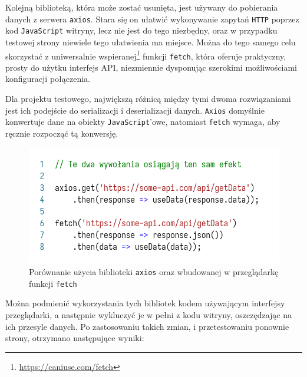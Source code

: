 \documentclass[licencjacka]{pracadypl}
\begin{document}
Kolejną biblioteką, która może zostać usunięta, jest używany do pobierania danych z serwera \texttt{axios}. Stara się on ułatwić wykonywanie zapytań \texttt{HTTP} poprzez kod \texttt{JavaScript} witryny, lecz nie jest do tego niezbędny, oraz w przypadku testowej strony niewiele tego ułatwienia ma miejsce. Można do tego samego celu skorzystać z uniwersalnie wspieranej\footnote{\url{https://caniuse.com/fetch}} funkcji \texttt{fetch}, która oferuje praktyczny, prosty do użytku interfejs API, niezmiennie dysponując szerokimi możliwościami konfiguracji połączenia.

Dla projektu testowego, największą różnicą między tymi dwoma rozwiązaniami jest ich podejście do serializacji i deserializacji danych. \texttt{Axios} domyślnie konwertuje dane na obiekty \texttt{JavaScript}'owe, natomiast \texttt{fetch} wymaga, aby ręcznie rozpocząć tą konwersję.

\begin{figure}[H]
  \centering
  \includegraphics[width=\linewidth]{images/code-js-axios-v-fetch.png}
  \caption{Porównanie użycia biblioteki \texttt{axios} oraz wbudowanej w przeglądarkę funkcji \texttt{fetch}}
  \label{fig:code-js-axios-v-fetch}
\end{figure}

Można podmienić wykorzystania tych bibliotek kodem używającym interfejsy przeglądarki, a następnie wykluczyć je w pełni z kodu witryny, oszczędzając na ich przesyle danych. Po zastosowaniu takich zmian, i przetestowaniu ponownie strony, otrzymano następujące wyniki:
\end{document}
